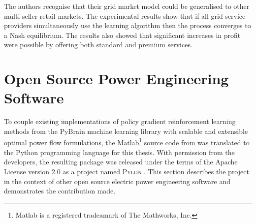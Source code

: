 The authors recognise that their grid market model could be generalised to
other multi-seller retail markets.  The experimental results show that if
all grid service providers simultaneously use the learning algorithm then the
process converges to a Nash equilibrium.  The results also showed that
significant increases in profit were possible by offering both standard and
premium services.



\newpage
\section{Open Source Power Engineering Software}
\label{sec:oss}
To couple existing implementations of policy gradient reinforcement
learning methods from the PyBrain machine learning library with scalable and
extensible optimal power flow formulations, the
Matlab\footnote{Matlab is a registered tradeamark of The Mathworks,
Inc.} source code from \matpower was translated to the Python programming
language for this thesis. With permission from the \matpower developers, the
resulting package was released under the terms of the Apache License version
2.0 as a project named \textsc{Pylon} \cite{lincoln:pyreto}.   This section describes the project in the context of other open source electric
power engineering software and demonstrates the contribution made.

